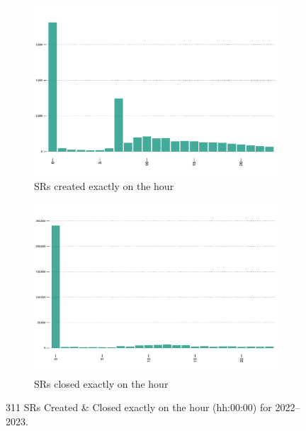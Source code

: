 \documentclass[linenumber]{jdsart}
\begin{document}
\begin{figure}[tbp]
    \centering
    \begin{subfigure}[t]{0.495\textwidth} %
        \centering
        \includegraphics[width=\textwidth]{2-year-trend_SRs_created_on_the_hour.pdf}
        \caption{SRs created exactly on the hour}
        \label{fig:busiestcreated}
    \end{subfigure}
    \hfill %
    \begin{subfigure}[t]{0.495\textwidth} %
        \centering
        \includegraphics[width=\textwidth]{2-year-trend_SRs_closed_on_the_hour.pdf}
        \caption{SRs closed exactly on the hour}
        \label{fig:busiestclosed}
    \end{subfigure}
    \caption{311 SRs Created \& Closed exactly on the hour (hh:00:00) for 2022--2023.}
    \label{fig:exacthours}
\end{figure}
\end{document}
